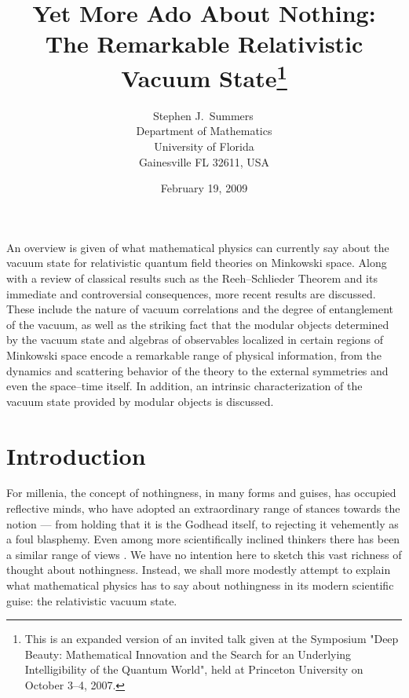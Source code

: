 \documentclass[12pt]{article}
\begin{document}
\title{Yet More Ado About Nothing: \\
The Remarkable Relativistic Vacuum State\thanks{This is an expanded 
version of an invited talk
given at the Symposium "Deep Beauty: Mathematical Innovation and the 
Search for an Underlying Intelligibility of the Quantum World", held 
at Princeton University on October 3--4, 2007. }
}
%
\author{{\Large Stephen J.\ Summers\,}\\[5mm]
Department of Mathematics \\
University of Florida \\ Gainesville FL 32611, USA}

%
\date{February 19, 2009} 


\maketitle 

{\abstract \noindent An overview is given of what mathematical physics
can currently say about the vacuum state for relativistic quantum
field theories on Minkowski space. Along with a review of classical
results such as the Reeh--Schlieder Theorem and its immediate and
controversial consequences, more recent results are discussed. These
include the nature of vacuum correlations and the degree of
entanglement of the vacuum, as well as the striking fact that the
modular objects determined by the vacuum state and algebras of
observables localized in certain regions of Minkowski space encode a
remarkable range of physical information, from the dynamics and
scattering behavior of the theory to the external symmetries and even
the space--time itself. In addition, an intrinsic characterization of
the vacuum state provided by modular objects is discussed.}


\section{Introduction} \label{intro}

     For millenia, the concept of nothingness, in many forms and
guises, has occupied reflective minds, who have adopted an extraordinary
range of stances towards the notion --- from holding that it is the
Godhead itself, to rejecting it vehemently as a foul blasphemy. Even
among more scientifically inclined thinkers there has
been a similar range of views \cite{Gr}. We have no intention here to
sketch this vast richness of thought about nothingness. Instead, we
shall more modestly attempt to explain what mathematical physics has
to say about nothingness in its modern scientific guise: the
relativistic vacuum state.
\end{document}
